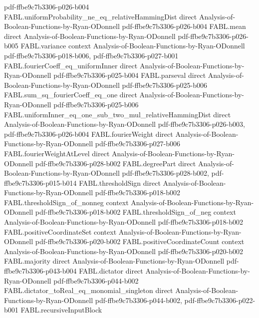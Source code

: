 \begin{theorem}
{    pdf-ffbe9c7b3306-p026-b004}
\proofstep
  {FABL.uniformProbability_ne_eq_relativeHammingDist}
  {direct}
  {Analysis-of-Boolean-Functions-by-Ryan-ODonnell}
  {pdf-ffbe9c7b3306-p026-b004}
\proofstep
  {FABL.mean}
  {direct}
  {Analysis-of-Boolean-Functions-by-Ryan-ODonnell}
  {pdf-ffbe9c7b3306-p026-b005}
\proofstep
  {FABL.variance}
  {context}
  {Analysis-of-Boolean-Functions-by-Ryan-ODonnell}
  {pdf-ffbe9c7b3306-p018-b006,
    pdf-ffbe9c7b3306-p027-b001}
\proofstep
  {FABL.fourierCoeff_eq_uniformInner}
  {direct}
  {Analysis-of-Boolean-Functions-by-Ryan-ODonnell}
  {pdf-ffbe9c7b3306-p025-b004}
\proofstep
  {FABL.parseval}
  {direct}
  {Analysis-of-Boolean-Functions-by-Ryan-ODonnell}
  {pdf-ffbe9c7b3306-p025-b006}
\proofstep
  {FABL.sum_sq_fourierCoeff_eq_one}
  {direct}
  {Analysis-of-Boolean-Functions-by-Ryan-ODonnell}
  {pdf-ffbe9c7b3306-p025-b006}
\proofstep
  {FABL.uniformInner_eq_one_sub_two_mul_relativeHammingDist}
  {direct}
  {Analysis-of-Boolean-Functions-by-Ryan-ODonnell}
  {pdf-ffbe9c7b3306-p026-b003,
    pdf-ffbe9c7b3306-p026-b004}
\proofstep
  {FABL.fourierWeight}
  {direct}
  {Analysis-of-Boolean-Functions-by-Ryan-ODonnell}
  {pdf-ffbe9c7b3306-p027-b006}
\proofstep
  {FABL.fourierWeightAtLevel}
  {direct}
  {Analysis-of-Boolean-Functions-by-Ryan-ODonnell}
  {pdf-ffbe9c7b3306-p028-b002}
\proofstep
  {FABL.degreePart}
  {direct}
  {Analysis-of-Boolean-Functions-by-Ryan-ODonnell}
  {pdf-ffbe9c7b3306-p028-b002,
    pdf-ffbe9c7b3306-p015-b014}
\proofstep
  {FABL.thresholdSign}
  {direct}
  {Analysis-of-Boolean-Functions-by-Ryan-ODonnell}
  {pdf-ffbe9c7b3306-p018-b002}
\proofstep
  {FABL.thresholdSign_of_nonneg}
  {context}
  {Analysis-of-Boolean-Functions-by-Ryan-ODonnell}
  {pdf-ffbe9c7b3306-p018-b002}
\proofstep
  {FABL.thresholdSign_of_neg}
  {context}
  {Analysis-of-Boolean-Functions-by-Ryan-ODonnell}
  {pdf-ffbe9c7b3306-p018-b002}
\proofstep
  {FABL.positiveCoordinateSet}
  {context}
  {Analysis-of-Boolean-Functions-by-Ryan-ODonnell}
  {pdf-ffbe9c7b3306-p020-b002}
\proofstep
  {FABL.positiveCoordinateCount}
  {context}
  {Analysis-of-Boolean-Functions-by-Ryan-ODonnell}
  {pdf-ffbe9c7b3306-p020-b002}
\proofstep
  {FABL.majority}
  {direct}
  {Analysis-of-Boolean-Functions-by-Ryan-ODonnell}
  {pdf-ffbe9c7b3306-p043-b004}
\proofstep
  {FABL.dictator}
  {direct}
  {Analysis-of-Boolean-Functions-by-Ryan-ODonnell}
  {pdf-ffbe9c7b3306-p044-b002}
\proofstep
  {FABL.dictator_toReal_eq_monomial_singleton}
  {direct}
  {Analysis-of-Boolean-Functions-by-Ryan-ODonnell}
  {pdf-ffbe9c7b3306-p044-b002,
    pdf-ffbe9c7b3306-p022-b001}
\proofstep
  {FABL.recursiveInputBlock}

\end{theorem}
